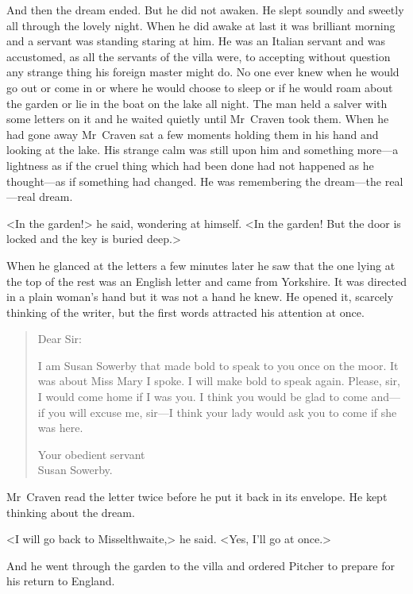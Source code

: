 And then the dream ended. But he did not awaken. He slept soundly and sweetly all through the lovely night. When he did awake at last it was brilliant morning and a servant was standing staring at him. He was an Italian servant and was accustomed, as all the servants of the villa were, to accepting without question any strange thing his foreign master might do. No one ever knew when he would go out or come in or where he would choose to sleep or if he would roam about the garden or lie in the boat on the lake all night. The man held a salver with some letters on it and he waited quietly until Mr~Craven took them. When he had gone away Mr~Craven sat a few moments holding them in his hand and looking at the lake. His strange calm was still upon him and something more—a lightness as if the cruel thing which had been done had not happened as he thought—as if something had changed. He was remembering the dream—the real—real dream.

<In the garden!> he said, wondering at himself. <In the garden! But the door is locked and the key is buried deep.>

When he glanced at the letters a few minutes later he saw that the one lying at the top of the rest was an English letter and came from Yorkshire. It was directed in a plain woman's hand but it was not a hand he knew. He opened it, scarcely thinking of the writer, but the first words attracted his attention at once.

\begin{quotation}
\noindent Dear Sir:

I am Susan Sowerby that made bold to speak to you once on the moor. It was about Miss Mary I spoke. I will make bold to speak again. Please, sir, I would come home if I was you. I think you would be glad to come and—if you will excuse me, sir—I think your lady would ask you to come if she was here.

\begin{flushright}
Your obedient servant\\
Susan Sowerby.
\end{flushright}
\end{quotation}

Mr~Craven read the letter twice before he put it back in its envelope. He kept thinking about the dream.

<I will go back to Misselthwaite,> he said. <Yes, I'll go at once.>

And he went through the garden to the villa and ordered Pitcher to prepare for his return to England.

